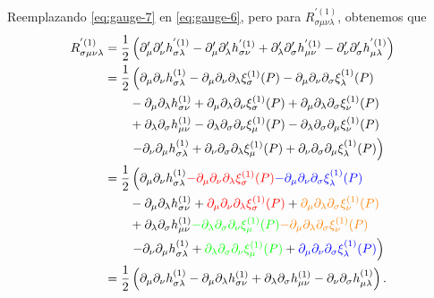 \documentclass[letterpaper,11pt]{article}
\begin{document}
Reemplazando \eqref{eq:gauge-7} en \eqref{eq:gauge-6}, pero para $R_{\sigma \mu\nu\lambda}^{'(1)}$, obtenemos que
\begin{align}
R_{\sigma \mu\nu\lambda}^{'(1)} &= \frac{1}{2} \left(\partial_{\mu} ' \partial_{\nu} ' h_{\sigma\lambda}^{'(1)} - \partial_{\mu} ' \partial_{\lambda} ' h_{\sigma\nu}^{'(1)} + \partial_{\lambda}' \partial_{\sigma} ' h_{\mu\nu}^{'(1)}- \partial_{\nu}' \partial_{\sigma} ' h_{\mu\lambda}^{'(1)}\right) \nonumber \\
&=  \frac{1}{2} \left(\partial_{\mu} \partial_{\nu} h_{\sigma\lambda}^{(1)} -  \partial_{\mu} \partial_{\nu} \partial_{\lambda} \xi^{(1)}_{\sigma}(P) -  \partial_{\mu} \partial_{\nu} \partial_{\sigma} \xi_{\lambda}^{(1)}(P) \right. \nonumber\\
&\qquad - \partial_{\mu} \partial_{\lambda} h_{\sigma\nu}^{(1)} + \partial_{\mu} \partial_{\lambda} \partial_{\nu} \xi^{(1)}_{\sigma}(P) +  \partial_{\mu} \partial_{\lambda} \partial_{\sigma} \xi_{\nu}^{(1)}(P) \nonumber \\
&\qquad  + \partial_{\lambda} \partial_{\sigma} h_{\mu\nu}^{(1)} -  \partial_{\lambda} \partial_{\sigma} \partial_{\nu} \xi^{(1)}_{\mu}(P) -  \partial_{\lambda} \partial_{\sigma} \partial_{\mu} \xi_{\nu}^{(1)}(P)  \nonumber \\
&\qquad \left. - \partial_{\nu} \partial_{\mu} h_{\sigma\lambda}^{(1)}  +  \partial_{\nu} \partial_{\sigma} \partial_{\lambda} \xi^{(1)}_{\mu}(P) + \partial_{\nu}  \partial_{\sigma} \partial_{\mu} \xi_{\lambda}^{(1)}(P)\right) \nonumber\\
&=  \frac{1}{2} \left(\partial_{\mu} \partial_{\nu} h_{\sigma\lambda}^{(1)}   \textcolor{red}{- \partial_{\mu} \partial_{\nu} \partial_{\lambda} \xi^{(1)}_{\sigma}(P)}  \textcolor{blue}{- \partial_{\mu} \partial_{\nu} \partial_{\sigma} \xi_{\lambda}^{(1)}(P)} \right. \nonumber\\
&\qquad - \partial_{\mu}\partial_{\lambda}h_{\sigma\nu}^{(1)} + \textcolor{red}{\partial_{\mu} \partial_{\nu} \partial_{\lambda}  \xi^{(1)}_{\sigma}(P)}    + \textcolor{orange}{ \partial_{\mu}\partial_{\lambda}\partial_{\sigma} \xi_{\nu}^{(1)}(P)} \nonumber \\
&\qquad  + \partial_{\lambda}\partial_{\sigma}h_{\mu\nu}^{(1)}   \textcolor{green}{- \partial_{\lambda} \partial_{\sigma} \partial_{\nu} \xi^{(1)}_{\mu}(P)}   \textcolor{orange}{- \partial_{\mu}\partial_{\lambda}\partial_{\sigma} \xi_{\nu}^{(1)}(P)}  \nonumber \\
&\qquad \left. - \partial_{\nu}\partial_{\mu}h_{\sigma\lambda}^{(1)} +   \textcolor{green}{ \partial_{\lambda} \partial_{\sigma} \partial_{\nu}  \xi^{(1)}_{\mu}(P)} +  \textcolor{blue}{\partial_{\mu} \partial_{\nu} \partial_{\sigma} \xi_{\lambda}^{(1)}(P)}\right) \nonumber\\
&= \frac{1}{2} \left(\partial_{\mu} \partial_{\nu} h_{\sigma\lambda}^{(1)} - \partial_{\mu} \partial_{\lambda} h_{\sigma\nu}^{(1)} + \partial_{\lambda} \partial_{\sigma} h_{\mu\nu}^{(1)}- \partial_{\nu} \partial_{\sigma} h_{\mu\lambda}^{(1)}\right). 
\end{align}
\end{document}
